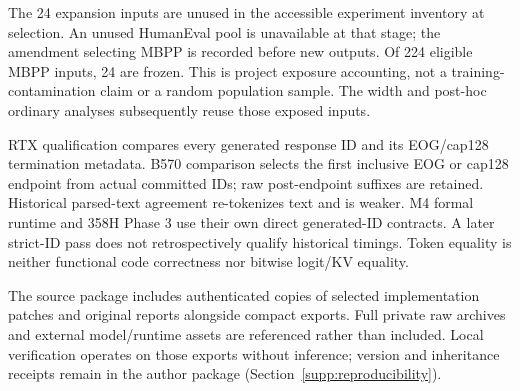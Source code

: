 The 24 expansion inputs are unused in the accessible experiment inventory at selection. An unused HumanEval pool is unavailable at that stage; the amendment selecting MBPP is recorded before new outputs. Of 224 eligible MBPP inputs, 24 are frozen. This is project exposure accounting, not a training-contamination claim or a random population sample. The width and post-hoc ordinary analyses subsequently reuse those exposed inputs.

RTX qualification compares every generated response ID and its EOG/cap128 termination metadata. B570 comparison selects the first inclusive EOG or cap128 endpoint from actual committed IDs; raw post-endpoint suffixes are retained. Historical parsed-text agreement re-tokenizes text and is weaker. M4 formal runtime and 358H Phase 3 use their own direct generated-ID contracts. A later strict-ID pass does not retrospectively qualify historical timings. Token equality is neither functional code correctness nor bitwise logit/KV equality.

The source package includes authenticated copies of selected implementation patches and original reports alongside compact exports. Full private raw archives and external model/runtime assets are referenced rather than included. Local verification operates on those exports without inference; version and inheritance receipts remain in the author package (Section~\ref{supp:reproducibility}).
